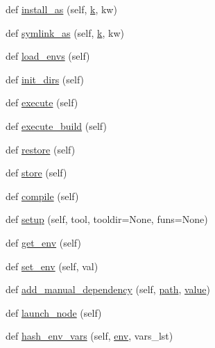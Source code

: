 \begin{DoxyCompactItemize}
def \hyperlink{classwaflib_1_1_build_1_1_build_context_aba7c5ce03b3cd0d2e8c490d6470a6a9e}{install\+\_\+as} (self, \hyperlink{rfft2d_test_m_l_8m_adc468c70fb574ebd07287b38d0d0676d}{k}, kw)
\item 
def \hyperlink{classwaflib_1_1_build_1_1_build_context_a9b86ee2dd78a51893a2135970f9c6c9c}{symlink\+\_\+as} (self, \hyperlink{rfft2d_test_m_l_8m_adc468c70fb574ebd07287b38d0d0676d}{k}, kw)
\item 
def \hyperlink{classwaflib_1_1_build_1_1_build_context_aeac17c7231c914a04f552b68428f1d0a}{load\+\_\+envs} (self)
\item 
def \hyperlink{classwaflib_1_1_build_1_1_build_context_adb8b13740f058cd0e790340c5f6edf06}{init\+\_\+dirs} (self)
\item 
def \hyperlink{classwaflib_1_1_build_1_1_build_context_a8ef990b5bfdcc98634c6e1248398ecc2}{execute} (self)
\item 
def \hyperlink{classwaflib_1_1_build_1_1_build_context_ab150f731e961183d0acef3aa8c38d345}{execute\+\_\+build} (self)
\item 
def \hyperlink{classwaflib_1_1_build_1_1_build_context_a9222c95f85009e82a95a4a8cbe2df934}{restore} (self)
\item 
def \hyperlink{classwaflib_1_1_build_1_1_build_context_ae39e78bf8a49550451ed42b0467fa9d5}{store} (self)
\item 
def \hyperlink{classwaflib_1_1_build_1_1_build_context_af7d834423f8c49384edaf3dbaa8c912e}{compile} (self)
\item 
def \hyperlink{classwaflib_1_1_build_1_1_build_context_ad26165fd9d32fe212a94936da03066c1}{setup} (self, tool, tooldir=None, funs=None)
\item 
def \hyperlink{classwaflib_1_1_build_1_1_build_context_a39240d22a6d298b74dabc40d8fb193a8}{get\+\_\+env} (self)
\item 
def \hyperlink{classwaflib_1_1_build_1_1_build_context_a8605b754128e554773a5962b55ec0741}{set\+\_\+env} (self, val)
\item 
def \hyperlink{classwaflib_1_1_build_1_1_build_context_aa550cf2655c922455d53077b4f1e4be1}{add\+\_\+manual\+\_\+dependency} (self, \hyperlink{classwaflib_1_1_build_1_1_build_context_afe3db622272692d0069d8b0f66c54a2c}{path}, \hyperlink{lib_2expat_8h_a4a30a13b813682e68c5b689b45c65971}{value})
\item 
def \hyperlink{classwaflib_1_1_build_1_1_build_context_a5ec1b12e273a3fcd437fd1e61292e8a1}{launch\+\_\+node} (self)
\item 
def \hyperlink{classwaflib_1_1_build_1_1_build_context_a4df53c421fdd1ea43eacfe0ec268fb07}{hash\+\_\+env\+\_\+vars} (self, \hyperlink{classwaflib_1_1_build_1_1_build_context_ac3b464a969bc6c898c739b6d820b2219}{env}, vars\+\_\+lst)

\end{DoxyCompactItemize}
